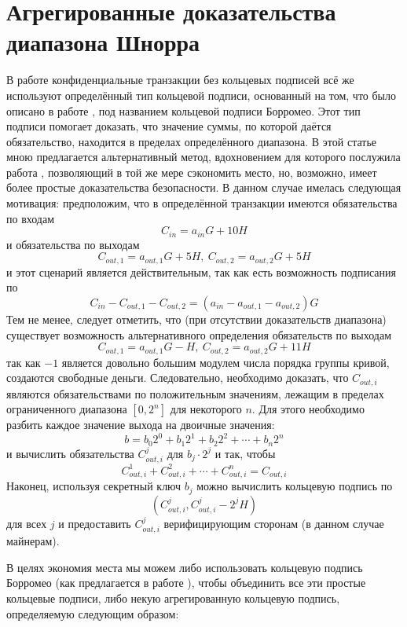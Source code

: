 \documentclass{mrl}
\theoremstyle{definition}
\numberwithin{thm}{section}
\begin{document}
\section{Агрегированные доказательства диапазона Шнорра}
\label{AgSchnorr}
В работе \cite{GM} конфиденциальные транзакции без кольцевых подписей всё же используют определённый тип кольцевой подписи, основанный на том, что было описано в работе \cite{abe}, под названием кольцевой подписи Борромео. Этот тип подписи помогает доказать, что значение суммы, по которой даётся обязательство, находится в пределах определённого диапазона. В этой статье мною предлагается альтернативный метод, вдохновением для которого послужила работа \cite{herranz}, позволяющий в той же мере сэкономить место, но, возможно, имеет более простые доказательства безопасности. В данном случае имелась следующая мотивация: предположим, что в определённой транзакции имеются обязательства по входам
\[
 C_{in} = a_{in} G + 10 H
\]
и обязательства по выходам
\[
 C_{out,1} = a_{out,1} G + 5 H,\ C_{out,2} = a_{out,2} G + 5 H
\]
и этот сценарий является действительным, так как есть возможность подписания по
\[
 C_{in} - C_{out,1} - C_{out,2} = \left(a_{in} - a_{out,1} - a_{out,2} \right) G
\]
Тем не менее, следует отметить, что (при отсутствии доказательств диапазона) существует возможность альтернативного определения обязательств по выходам
\[
C_{out,1} = a_{out,1} G - H,\ C_{out,2} = a_{out,2} G + 11 H
\]
так как $-1$ является довольно большим модулем числа порядка группы кривой, создаются свободные деньги. Следовательно, необходимо доказать, что $C_{out,i}$ являются обязательствами по положительным значениям, лежащим в пределах ограниченного диапазона $[0,2^n]$ для некоторого $n$. Для этого необходимо разбить каждое значение выхода на двоичные значения:
\[
 b = b_0 2^0 + b_1 2^1 + b_2 2^2 + \cdots + b_n 2^n
\]
и вычислить обязательства $C_{out,i}^j$ для $b_j \cdot 2^j $ и так, чтобы
\[
 C_{out,i}^1 + C_{out,i}^2 + \cdots + C_{out,i}^n = C_{out,i}
\]
Наконец, используя секретный ключ $b_j$ можно вычислить кольцевую подпись по
\[
 (C_{out,i}^j, C_{out,i}^j - 2^j H)
\]
для всех $j$ и предоставить $C_{out,i}^j$ верифицирующим сторонам (в данном случае майнерам).

В целях экономия места мы можем либо использовать кольцевую подпись Борромео (как предлагается в работе \cite{GM}), чтобы объединить все эти простые кольцевые подписи, либо некую агрегированную кольцевую подпись, определяемую следующим образом:
\end{document}
